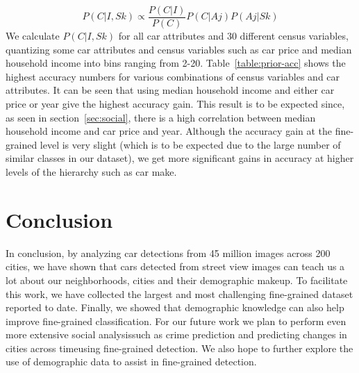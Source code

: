 \documentclass[10pt,twocolumn,letterpaper]{article}
\begin{document}
\begin{equation}
  P(C|I,Sk) \propto \frac{P(C|I)}{P(C)}P(C|Aj)P(Aj|Sk)
\end{equation}
We calculate \(P(C|I,Sk)\) for all car attributes and 30 different census variables, quantizing some car attributes and census variables such as car price and median household income into bins ranging from 2-20. Table~\ref{table:prior-acc} shows the highest accuracy numbers for various combinations of census variables and car attributes. It can be seen that using median household income and either car price or year give the highest accuracy gain. This result is to be expected since, as seen in section~\ref{sec:social}, there is a high correlation between median household income and car price and year. Although the accuracy gain at the fine-grained level is very slight (which is to be expected due to the large number of similar classes in our dataset), we get more significant gains in accuracy at higher levels of the hierarchy such as car make. 

\section{Conclusion}
In conclusion, by analyzing car detections from 45 million images across 200 cities, we have shown that cars detected from street view images can teach us a lot about our neighborhoods, cities and their demographic makeup. To facilitate this work, we have collected the largest and most challenging fine-grained dataset reported to date. Finally, we showed that demographic knowledge can also help improve fine-grained classification. For our future work we plan to perform even more extensive social analysis\textemdash such as crime prediction and predicting changes in cities across time\textemdash using fine-grained detection. We also hope to further explore the use of demographic data to assist in fine-grained detection. 
{\small


}
\end{document}
